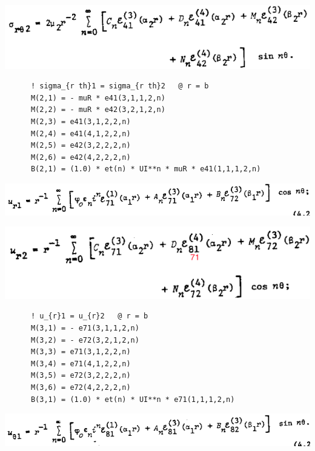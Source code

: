 \documentclass [11pt,spanish]{article}
\begin{document}
\includegraphics[scale=0.5]{srt2}
\begingroup
\fontsize{10pt}{12pt}
\selectfont
{}
\begin{shaded}
\begin{verbatim}
      ! sigma_{r th}1 = sigma_{r th}2   @ r = b
      M(2,1) = - muR * e41(3,1,1,2,n)
      M(2,2) = - muR * e42(3,2,1,2,n)
      M(2,3) = e41(3,1,2,2,n)
      M(2,4) = e41(4,1,2,2,n)
      M(2,5) = e42(3,2,2,2,n)
      M(2,6) = e42(4,2,2,2,n)
      B(2,1) = (1.0) * et(n) * UI**n * muR * e41(1,1,1,2,n)

\end{verbatim}
\end{shaded}
\endgroup
\includegraphics[scale=0.5]{ur1}

\includegraphics[scale=0.5]{ur2}
\begingroup
\fontsize{10pt}{12pt}
\selectfont
{}
\begin{shaded}
\begin{verbatim}
      ! u_{r}1 = u_{r}2   @ r = b
      M(3,1) = - e71(3,1,1,2,n) 
      M(3,2) = - e72(3,2,1,2,n) 
      M(3,3) = e71(3,1,2,2,n)
      M(3,4) = e71(4,1,2,2,n) 
      M(3,5) = e72(3,2,2,2,n)
      M(3,6) = e72(4,2,2,2,n)
      B(3,1) = (1.0) * et(n) * UI**n * e71(1,1,1,2,n)
\end{verbatim}
\end{shaded}
\endgroup
\includegraphics[scale=0.5]{ut1}
\end{document}
